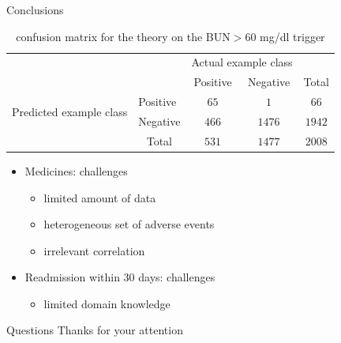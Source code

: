 \message{ !name(presentation.tex)}\documentclass{beamer}
\begin{document}
\begin{frame}{Conclusions}
\begin{table}
  \begin{tabular}{l|l|c|c|c}
    \multicolumn{2}{c}{}&\multicolumn{2}{c}{Actual example class}&\\
    \cline{3-4}
    \multicolumn{2}{c|}{}&Positive&Negative&\multicolumn{1}{c}{Total}\\
    \cline{2-4}
    \multirow{2}{*}{Predicted example class}& Positive & $65$ & $1$ & $66$\\
    \cline{2-4}
    & Negative & $466$ & $1476$ & $1942$\\
    \cline{2-4}
    \multicolumn{1}{c}{} & \multicolumn{1}{c}{Total} & \multicolumn{1}{c}{$531$} & \multicolumn{1}{c}{$1477$} & \multicolumn{1}{c}{$2008$}\\
  \end{tabular}
  \caption {confusion matrix for the theory on the BUN$>$60 mg/dl trigger}
  \label{confusion-matrix-bun}
\end{table}
\pause
\begin{itemize}
\item Medicines: challenges \pause
  \begin{itemize}
  \item limited amount of data
  \item heterogeneous set of adverse events
  \item irrelevant correlation \pause
  \end{itemize}
\item Readmission within 30 days: challenges \pause
  \begin{itemize}
  \item limited domain knowledge
  \end{itemize}
\end{itemize}
\end{frame}

\begin{frame}{Questions}
\centering
Thanks for your attention
\end{frame}




\end{document}

